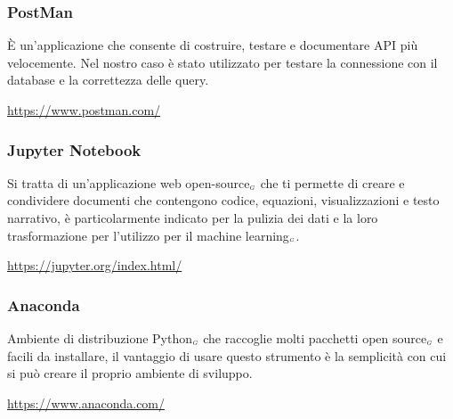 \subsubsection{PostMan}\label{ProcessiPrimariStrumentiPostMan}
È un’applicazione che consente di costruire, testare e documentare API più velocemente. Nel nostro caso è stato utilizzato per testare la connessione con il database e la correttezza delle query.
\begin{center}
	\url{https://www.postman.com/}
\end{center}
\subsubsection{Jupyter Notebook}\label{ProcessiPrimariStrumentiJupyterNotebook}
Si tratta di un’applicazione web open-source$_{\scaleto{G}{3pt}}$ che ti permette di creare e condividere documenti che contengono codice, equazioni, visualizzazioni e testo narrativo, è particolarmente indicato per la pulizia dei dati e la loro trasformazione per l’utilizzo per il machine learning$_{\scaleto{G}{3pt}}$.
\begin{center}
	\url{https://jupyter.org/index.html/}
\end{center}
\subsubsection{Anaconda}\label{ProcessiPrimariStrumentiAnaconda}
Ambiente di distribuzione Python$_{\scaleto{G}{3pt}}$ che raccoglie molti pacchetti open source$_{\scaleto{G}{3pt}}$ e facili da installare, il vantaggio di usare questo strumento è la semplicità con cui si può creare il proprio ambiente di sviluppo.
\begin{center}
	\url{https://www.anaconda.com/}
\end{center}

